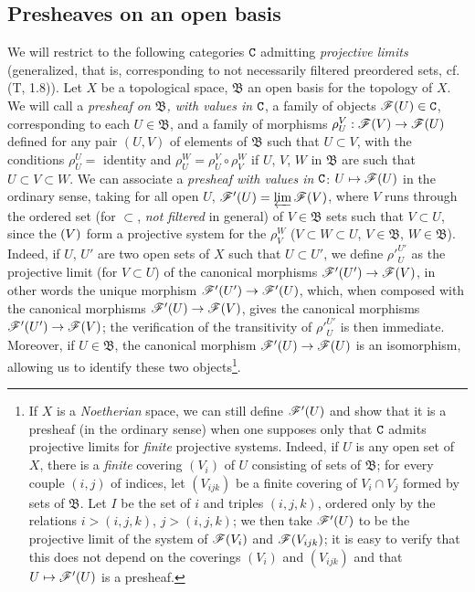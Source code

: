 \subsection{Presheaves on an open basis}
\label{subsection-presheaves-on-open-basis}

\begin{env}[3.2.1]
\label{env-0.3.2.1}
We will restrict to the following categories $\mathtt{C}$ admitting {\em projective
limits} (generalized, that is, corresponding to not necessarily filtered
preordered sets, cf. (T, 1.8)). Let $X$ be a topological space, $\mathfrak{B}$
an open basis for the topology of $X$. We will call a {\em presheaf on
$\mathfrak{B}$, with values in $\mathtt{C}$}, a family of objects $\mathscr{F}(U)\in\mathtt{C}$,
corresponding to each $U\in\mathfrak{B}$, and a family of morphisms $\rho_U^V:\mathscr{F}(V)\to\mathscr{F}(U)$ defined for any pair $(U,V)$ of elements of
$\mathfrak{B}$ such that $U\subset V$,
with the conditions $\rho_U^U=$ identity and $\rho_U^W=\rho_U^V\circ\rho_V^W$ if
$U$, $V$, $W$ in $\mathfrak{B}$ are such that $U\subset V\subset W$. We can
associate a {\em presheaf with values in $\mathtt{C}$}: $U\mapsto\mathscr{F}(U)$ in the
ordinary sense, taking for all open $U$, $\mathscr{F}'(U)=\varprojlim\mathscr{F}(V)$,
where $V$ runs through the ordered set (for $\subset$, {\em not filtered} in
general) of $V\in\mathfrak{B}$ sets such that $V\subset U$, since the $\mathscr(V)$
form a projective system for the $\rho_V^W$ ($V\subset W\subset U$,
$V\in\mathfrak{B}$, $W\in\mathfrak{B}$). Indeed, if $U$, $U'$ are two open sets
of $X$ such that $U\subset U'$, we define ${\rho'}_U^{U'}$ as the projective
limit (for $V\subset U$) of the canonical morphisms $\mathscr{F}'(U')\to\mathscr{F}(V)$,
in other words the unique morphism $\mathscr{F}'(U')\to\mathscr{F}'(U)$, which, when
composed with the canonical morphisms $\mathscr{F}'(U)\to\mathscr{F}(V)$, gives the
canonical morphisms $\mathscr{F}'(U')\to\mathscr{F}(V)$; the verification of the
transitivity of ${\rho'}_U^{U'}$ is then immediate. Moreover, if
$U\in\mathfrak{B}$, the canonical morphism $\mathscr{F}'(U)\to\mathscr{F}(U)$ is an
isomorphism, allowing us to identify these two objects\footnote{If $X$ is a
{\em Noetherian} space, we can still define $\mathscr{F}'(U)$ and show that it is a
presheaf (in the ordinary sense) when one supposes only that $\mathtt{C}$ admits
projective limits for {\em finite} projective systems. Indeed, if $U$ is any
open set of $X$, there is a {\em finite} covering $(V_i)$ of $U$ consisting of
sets of $\mathfrak{B}$; for every couple $(i,j)$ of indices, let $(V_{ijk})$ be
a finite covering of $V_i\cap V_j$ formed by sets of $\mathfrak{B}$. Let $I$ be
the set of $i$ and triples $(i,j,k)$, ordered only by the relations $i>(i,j,k)$,
$j>(i,j,k)$; we then take $\mathscr{F}'(U)$ to be the projective limit of the system
of $\mathscr{F}(V_i)$ and $\mathscr{F}(V_{ijk})$; it is easy to verify that this does not
depend on the coverings $(V_i)$ and $(V_{ijk})$ and that $U\mapsto\mathscr{F}'(U)$ is
a presheaf.}.
\end{env}


